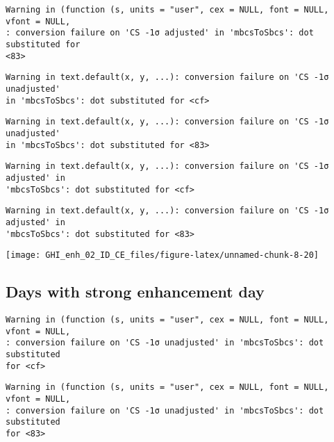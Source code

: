 \documentclass[
  10pt,
  a4paper,oneside]{article}
\begin{document}
\begin{verbatim}
Warning in (function (s, units = "user", cex = NULL, font = NULL, vfont = NULL,
: conversion failure on 'CS -1σ adjusted' in 'mbcsToSbcs': dot substituted for
<83>
\end{verbatim}

\begin{verbatim}
Warning in text.default(x, y, ...): conversion failure on 'CS -1σ unadjusted'
in 'mbcsToSbcs': dot substituted for <cf>
\end{verbatim}

\begin{verbatim}
Warning in text.default(x, y, ...): conversion failure on 'CS -1σ unadjusted'
in 'mbcsToSbcs': dot substituted for <83>
\end{verbatim}

\begin{verbatim}
Warning in text.default(x, y, ...): conversion failure on 'CS -1σ adjusted' in
'mbcsToSbcs': dot substituted for <cf>
\end{verbatim}

\begin{verbatim}
Warning in text.default(x, y, ...): conversion failure on 'CS -1σ adjusted' in
'mbcsToSbcs': dot substituted for <83>
\end{verbatim}

\begin{center}\texttt{[image: GHI\_enh\_02\_ID\_CE\_files/figure-latex/unnamed-chunk-8-20]} \end{center}

\FloatBarrier

\hypertarget{days-with-strong-enhancement-day}{%
\subsection{Days with strong enhancement day}\label{days-with-strong-enhancement-day}}

\begin{verbatim}
Warning in (function (s, units = "user", cex = NULL, font = NULL, vfont = NULL,
: conversion failure on 'CS -1σ unadjusted' in 'mbcsToSbcs': dot substituted
for <cf>
\end{verbatim}

\begin{verbatim}
Warning in (function (s, units = "user", cex = NULL, font = NULL, vfont = NULL,
: conversion failure on 'CS -1σ unadjusted' in 'mbcsToSbcs': dot substituted
for <83>
\end{verbatim}
\end{document}

